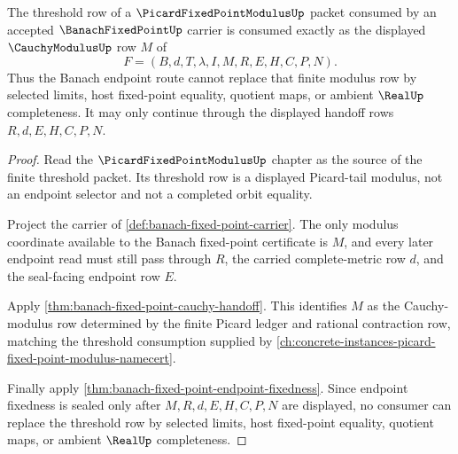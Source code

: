 \begin{theorem}
\label{thm:banach-fixed-point-picard-modulus-consumption}
The threshold row of a $\PicardFixedPointModulusUp$ packet consumed by an accepted $\BanachFixedPointUp$ carrier is consumed exactly as the displayed $\CauchyModulusUp$ row $M$ of
$$
F=(B,d,T,\lambda,I,M,R,E,H,C,P,N).
$$
Thus the Banach endpoint route cannot replace that finite modulus row by selected limits, host fixed-point equality, quotient maps, or ambient $\RealUp$ completeness. It may only continue through the displayed handoff rows $R,d,E,H,C,P,N$.
\end{theorem}
\begin{proof}
Read the $\PicardFixedPointModulusUp$ chapter as the source of the finite threshold packet. Its threshold row is a displayed Picard-tail modulus, not an endpoint selector and not a completed orbit equality.

Project the carrier of \autoref{def:banach-fixed-point-carrier}. The only modulus coordinate available to the Banach fixed-point certificate is $M$, and every later endpoint read must still pass through $R$, the carried complete-metric row $d$, and the seal-facing endpoint row $E$.

Apply \autoref{thm:banach-fixed-point-cauchy-handoff}. This identifies $M$ as the Cauchy-modulus row determined by the finite Picard ledger and rational contraction row, matching the threshold consumption supplied by \autoref{ch:concrete-instances-picard-fixed-point-modulus-namecert}.

Finally apply \autoref{thm:banach-fixed-point-endpoint-fixedness}. Since endpoint fixedness is sealed only after $M,R,d,E,H,C,P,N$ are displayed, no consumer can replace the threshold row by selected limits, host fixed-point equality, quotient maps, or ambient $\RealUp$ completeness.
\end{proof}

